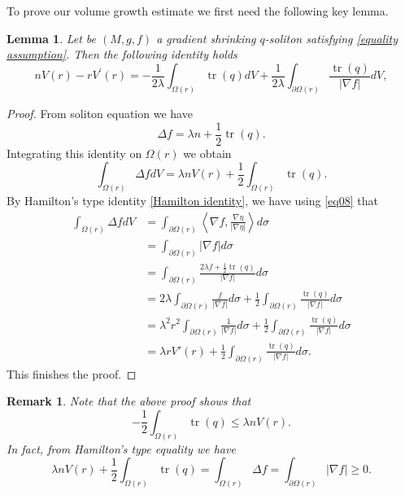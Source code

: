 \documentclass{amsart}
\theoremstyle{plain}
\newtheorem{lemma}[theorem]{\bf Lemma}
\newtheorem{remark}[theorem]{Remark}
\numberwithin{equation}{section}
\begin{document}
To prove our volume growth estimate we first need the following key lemma. 
\begin{lemma}\label{lemma6} Let be $(M,g,f)$ a gradient shrinking $q$-soliton satisfying \eqref{equality assumption}. Then the following identity holds 
    \begin{equation*}
        nV(r)-rV^{\prime}(r)= -\frac{1}{2\lambda }\int_{\Omega(r)}\operatorname{tr}(q) dV + \frac{1}{2\lambda}\int_{\partial \Omega(r)} \frac{\operatorname{tr}(q)}{|\nabla f|}dV,
    \end{equation*}
\end{lemma}
\begin{proof}
    From soliton equation we have 
    $$ \Delta f = \lambda n + \frac{1}{2} \operatorname{tr}(q).
$$
Integrating this identity on $\Omega(r)$ we obtain \begin{equation}\label{eq4.4}
    \int_{\Omega(r)} \Delta f dV= \lambda nV(r) + \frac{1}{2}\int_{\Omega(r)}\operatorname{tr}(q).
\end{equation}
By Hamilton's type identity \eqref{Hamilton identity}, we have using \eqref{eq08} that \begin{align*}
    \int_{\Omega(r)}\Delta f dV & = \int_{\partial \Omega(r)} \left\langle \nabla f, \frac{\nabla \eta}{|\nabla \eta|} \right\rangle d\sigma \\
    & = \int_{\partial \Omega(r)}|\nabla f| d\sigma \\
    & = \int_{\partial \Omega(r)}\frac{2\lambda f+\frac{1}{2}\operatorname{tr}(q)}{|\nabla f|}d\sigma \\
    & = 2\lambda \int_{\partial \Omega(r)}\frac{f}{|\nabla f|}d\sigma + \frac{1}{2}\int_{\partial \Omega(r)}\frac{\operatorname{tr}(q)}{|\nabla f|} d\sigma\\
    & = \lambda^2r^2\int_{\partial \Omega(r)}\frac{1}{|\nabla f|}d\sigma + \frac{1}{2}\int_{\partial \Omega(r)}\frac{\operatorname{tr}(q)}{|\nabla f|} d\sigma\\
    & = \lambda rV'(r)+\frac{1}{2}\int_{\partial \Omega(r)}\frac{\operatorname{tr}(q)}{|\nabla f|} d\sigma.
\end{align*}
This finishes the proof.
\end{proof}

\begin{remark}\label{remk03}
    Note that the above proof shows that 
    \begin{equation}
-\frac{1}{2}\int_{\Omega(r)}\operatorname{tr}(q)\leq \lambda nV(r).
    \end{equation}
    In fact, from Hamilton's type equality we have
    $$\lambda nV(r) + \frac{1}{2}\int_{\Omega(r)}\operatorname{tr}(q)=\int_{\Omega(r)}\Delta f=\int_{\partial\Omega(r)}|\nabla f|\geq0.$$
\end{remark}
\end{document}
